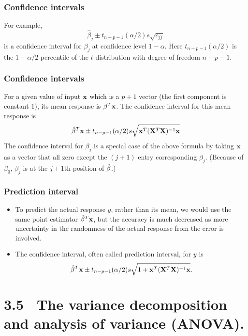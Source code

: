 \documentclass{beamer}
\begin{document}
      
      \begin{frame}
      	\frametitle{ Confidence intervals}
      	
      	For example,
      	$$\hat \beta_j \pm t_{n-p-1}(\alpha/2) s \sqrt{c_{jj}}$$
      	is a confidence interval for $\beta_j$ at confidence level $1-\alpha$. Here
      	$t_{n-p-1}(\alpha/2)$ is the $1-\alpha/2$ percentile of the $t$-distribution with
      	degree of freedom $n-p-1$.
      \end{frame}
      
      
      \begin{frame}
      	\frametitle{ Confidence intervals}
      	
      	
      	For a given value of input $\bf x$ which is a $p+1$ vector (the first component is constant 1), its mean response is $ {\bf \beta}^T{\bf x}$.
      	The confidence interval for this mean response is
      	$$ \hat {\bf \beta}^T{\bf x} \pm t_{n-p-1}(\alpha/2) s \sqrt{ {\bf x}^T({\bf X}^T {\bf X})^{-1} { \bf x}}$$
      	The confidence interval for $\beta_j$ is a special case of the above formula by taking
      	${\bf x}$ as a vector that all zero except the $(j+1)$ entry corresponding $\beta_j$. (Because of
      	$\beta_0$, $\beta_j$  is at the $j+1$th position of $\hat {\bf \beta}$.)
      	
      \end{frame}	
      
      \begin{frame}
      	\frametitle{Prediction interval}
      	\begin{itemize}
      		
      		\item To predict the actual response $y$, rather than its mean, we would use the same point estimator
      		$\hat {\bf \beta}^T{\bf x}$, but the accuracy is much decreased as more uncertainty in the randomness
      		of the actual response from the error is involved.
      		\item
      		The confidence interval, often called prediction interval, for $y$ is
      		$$\hat {\bf \beta}^T{\bf x} \pm t_{n-p-1}(\alpha/2) s \sqrt{ 1+ {\bf x}^T({\bf X}^T {\bf X})^{-1} { \bf x}}.$$
      		
      		
      	\end{itemize}
      \end{frame}
      
      \section{3.5 \ The variance decomposition and analysis of variance (ANOVA).}
      
\end{document}

